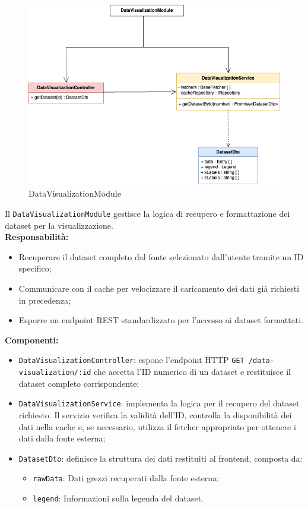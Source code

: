 \begin{figure}[H] 
    \centering
    \includegraphics[scale = 0.5]{template/images/uml_back/DataVisModule.png}
    \caption{DataVisualizationModule}
\end{figure}

Il \texttt{DataVisualizationModule} gestisce la logica di recupero e formattazione dei dataset per la visualizzazione.\\

\textbf{Responsabilità:}
\begin{itemize}
    \item Recuperare il dataset completo dal fonte selezionato dall'utente tramite un ID specifico;
    \item Communicare con il cache per velocizzare il caricamento dei dati già richiesti in precedenza;
    \item Esporre un endpoint REST standardizzato per l'accesso ai dataset formattati.
\end{itemize}

\textbf{Componenti:}
\begin{itemize}
    \item \texttt{DataVisualizationController}: espone l'endpoint HTTP \texttt{GET /data-visualization/:id} che accetta l'ID numerico di un dataset e restituisce il dataset completo corrispondente;
    \item \texttt{DataVisualizationService}: implementa la logica per il recupero del dataset richiesto. Il servizio verifica la validità dell'ID, controlla la disponibilità dei dati nella cache e, se necessario, utilizza il fetcher appropriato per ottenere i dati dalla fonte esterna;
    \item \texttt{DatasetDto}: definisce la struttura dei dati restituiti al frontend, composta da:
    \begin{itemize}
        \item \texttt{rawData}: Dati grezzi recuperati dalla fonte esterna;
        \item \texttt{legend}: Informazioni sulla legenda del dataset.
    \end{itemize}
\end{itemize}

